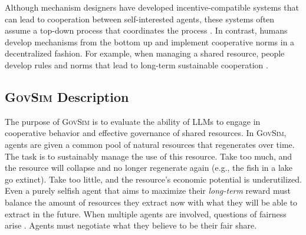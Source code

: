 \documentclass{article}
\newcommand{\envAbbr}{\textsc{GovSim}\xspace}
\begin{document}
Although mechanism designers have developed incentive-compatible systems that can lead to cooperation between self-interested agents, these systems often assume a top-down process that coordinates the process \citep{shoham2008multiagent,zheng2022ai}. In contrast, humans develop mechanisms from the bottom up and implement cooperative norms in a decentralized fashion. For example, when managing a shared resource, people develop rules and norms that lead to long-term sustainable cooperation \citep{ostrom1990governing, ostrom1999revisiting, ellickson1991order}. 


\subsection{\envAbbr Description}

\newcommand{\criticalCollapse}{C}
%
The purpose of \envAbbr is
%
to evaluate the ability of LLMs to engage in cooperative behavior and effective governance of shared resources.  In \envAbbr, agents are given a common pool of natural resources that regenerates over time. The task is to sustainably manage the use of this resource. Take too much, and the resource will collapse and no longer regenerate again (e.g., the fish in a lake go extinct). Take too little, and the resource's economic potential is underutilized. Even a purely selfish agent that aims to maximize their \textit{long-term} reward must balance the amount of resources they extract now with what they will be able to extract in the future. When multiple agents are involved, questions of fairness arise \citep{kleiman2017constructing, kraft2023assessing}. Agents must negotiate what they believe to be their fair share. 
\end{document}
